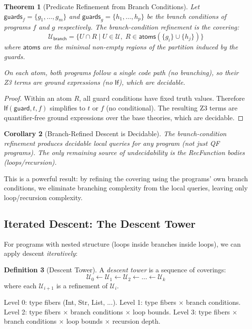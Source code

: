 \documentclass[11pt,a4paper]{report}
\theoremstyle{definition}
\newtheorem{definition}{Definition}[chapter]
\theoremstyle{plain}
\newtheorem{theorem}[definition]{Theorem}
\newtheorem{corollary}[definition]{Corollary}
\newcommand{\covers}{\mathcal{U}}
\begin{document}
\begin{theorem}[Predicate Refinement from Branch Conditions]
\label{thm:pred-refinement}
Let $\mathsf{guards}_f = \{g_1, \ldots, g_m\}$ and
$\mathsf{guards}_g = \{h_1, \ldots, h_p\}$ be the branch conditions
of programs $f$ and $g$ respectively.  The \emph{branch-condition
refinement} is the covering:
\[
  \covers_\mathsf{branch} = \{U \cap R \mid U \in \covers,\;
    R \in \mathsf{atoms}(\{g_i\} \cup \{h_j\})\}
\]
where $\mathsf{atoms}$ are the minimal non-empty regions of the
partition induced by the guards.

On each atom, \emph{both} programs follow a single code path
(no branching), so their Z3 terms are ground expressions
(no $\mathsf{If}$), which are decidable.
\end{theorem}

\begin{proof}
Within an atom $R$, all guard conditions have fixed truth values.
Therefore $\mathsf{If}(\mathsf{guard}, t, f)$ simplifies to $t$ or
$f$ (no conditional).  The resulting Z3 terms are quantifier-free
ground expressions over the base theories, which are decidable.
\end{proof}

\begin{corollary}[Branch-Refined Descent is Decidable]
The branch-condition refinement produces decidable local queries
for \emph{any} program (not just QF programs).  The only remaining
source of undecidability is the RecFunction bodies (loops/recursion).
\end{corollary}

This is a powerful result: by refining the covering using the
programs' own branch conditions, we eliminate branching complexity
from the local queries, leaving only loop/recursion complexity.

\subsection{Iterated Descent: The Descent Tower}

For programs with nested structure (loops inside branches inside
loops), we can apply descent \emph{iteratively}:

\begin{definition}[Descent Tower]
\label{def:descent-tower}
A \emph{descent tower} is a sequence of coverings:
\[
  \covers_0 \leftarrow \covers_1 \leftarrow \covers_2
    \leftarrow \ldots \leftarrow \covers_k
\]
where each $\covers_{i+1}$ is a refinement of $\covers_i$.

Level 0: type fibers (Int, Str, List, ...).
Level 1: type fibers $\times$ branch conditions.
Level 2: type fibers $\times$ branch conditions $\times$ loop bounds.
Level 3: type fibers $\times$ branch conditions $\times$ loop bounds
  $\times$ recursion depth.
\end{definition}
\end{document}
